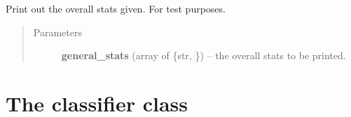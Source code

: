 \documentclass[letterpaper,10pt,english]{sphinxmanual}
\begin{document}
\begin{fulllineitems}
\begin{fulllineitems}
\end{fulllineitems}


\begin{fulllineitems}
\label{index:trainer.Trainer.trainer_print}
Print out the overall stats given. For test purposes.
\begin{quote}\begin{description}
\item[{Parameters}] \leavevmode
\textbf{general\_stats} (array of \{str, {\hyperref[index:gen_stat.Stat]{}}\}) -- the overall stats to be printed.

\end{description}\end{quote}

\end{fulllineitems}


\end{fulllineitems}



\section{The classifier class}
\label{index:the-classifier-class}\label{index:module-classifier}
\end{document}
